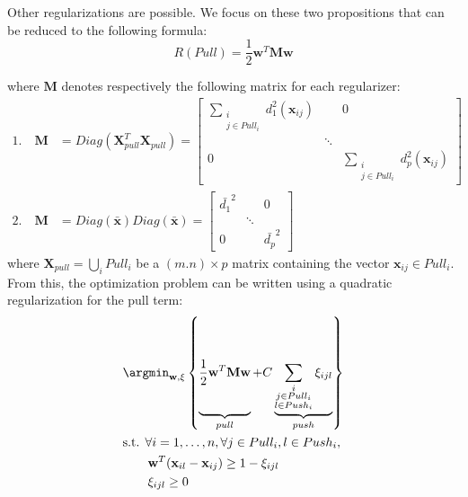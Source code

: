 \noindent Other regularizations are possible. We focus on these two propositions that can be reduced to the following formula:
\begin{equation}
R(Pull) = \frac{1}{2} \textbf{w}^T \textbf{M} \textbf{w}
\end{equation}

\noindent where $\textbf{M}$ denotes respectively the following matrix for each regularizer:
\begin{align}
	1. \quad \textbf{M} &= Diag(\textbf{X}_{pull}^T\textbf{X}_{pull}) = 
	\begin{bmatrix} 
		\sum\limits_{\substack{i \\ j \in Pull_i}} d_1^2(\textbf{x}_{ij}) 		&  	& 0 \\ 
		& \ddots 	&  \\ 
		0 		&  	& \sum\limits_{\substack{i \\ j \in Pull_i}} d_p^2(\textbf{x}_{ij})
	\end{bmatrix} \label{eq:M_1} \\
	2. \quad \textbf{M} &= Diag(\bar{\textbf{x}}) Diag(\bar{\textbf{x}}) =
	\begin{bmatrix} 
		\bar{d_1}^2 &  	& 0 \\ 
		& \ddots 	&  \\ 
		0 		&  	& \bar{d_p}^2
	\end{bmatrix} \label{eq:M_2}
\end{align}
where $\textbf{X}_{pull} = \bigcup_i Pull_i $ be a $(m.n) \times p$ matrix containing the vector $\textbf{x}_{ij} \in Pull_i$. \\

\noindent From this, the optimization problem can be written using a quadratic regularization for the pull term:
\begin{equation}
	\begin{aligned}
	&\displaystyle 		\argmin_{\textbf{w},\xi}
	\left\lbrace \underbrace{
		\vphantom{ \sum\limits_{\substack{i \\ j \in Pull_i \\ l \in Push_i}} }
		\frac{1}{2} \textbf{w}^T \textbf{M} \textbf{w}		
	}_{pull}				
	+					
	C
	\underbrace{
	\sum\limits_{\substack{i \\ j \in Pull_i \\ l \in Push_i}}  \xi_{ijl}
	}_{push}
	\right\rbrace  \\
	&\text{s.t.  } \forall i = 1, \ldots, n, \forall j \in Pull_i, l \in Push_i, \\
	& \qquad \textbf{w}^T(\textbf{x}_{il}-\textbf{x}_{ij}) \geq 1-\xi_{ijl} \\
	& \qquad \xi_{ijl} \geq 0 
	\end{aligned}
	\label{eq:quadratic}
\end{equation}

